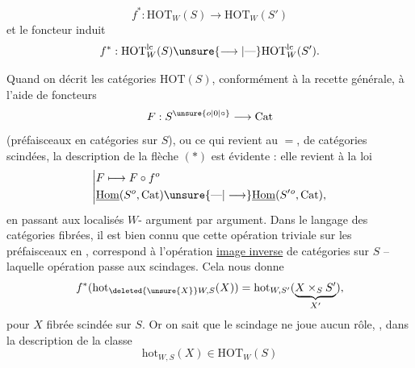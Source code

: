 \[
f^*:\mathrm{HOT}_W(S)\longrightarrow\mathrm{HOT}_W(S')\tag*{$(*)$}
\]
et le foncteur induit
\[
f^*:\mathrm{HOT}^{\mathrm{lc}}_W(S)\unsure{\longrightarrow|\text{---}}\mathrm{HOT}^{\mathrm{lc}}_W(S').
\]

Quand on décrit les catégories $\mathrm{HOT}(S)$, conformément à la recette générale, à l'aide de  foncteurs
\[
F:S^{\unsure{o|0|\circ}}\longrightarrow\mathrm{Cat}
\]
(préfaisceaux en catégories sur $S$), ou ce qui revient au $=$, de catégories scindées, la description de la  flèche $(*)$ est évidente : elle revient à la loi
\[
\left|\begin{aligned}
&F\longmapsto F\circ f^o\\
&\underline{\mathrm{Hom}}(S^o,\mathrm{Cat})\unsure{\text{---}|\longrightarrow}\underline{\mathrm{Hom}}(S'{}^o,\mathrm{Cat}),
\end{aligned}\right.
\]
en passant aux localisés  $W$- argument par argument. Dans le langage des catégories fibrées, il est bien connu que cette opération triviale sur les préfaisceaux en , correspond à l'opération \uline{image inverse} de catégories sur $S$ -- laquelle opération passe aux scindages.
Cela nous donne 
\[
f^*(\mathrm{hot}_{\deleted{\unsure{X}}W,S}(X))=\mathrm{hot}_{W,S'}(\underbrace{X\times_S S'}_{X'}),
\]
pour  $X$ fibrée scindée sur $S$. Or on sait que le scindage  ne joue aucun rôle, , dans la description de la classe
\[
\mathrm{hot}_{W,S}(X)\in\mathrm{HOT}_W(S)
\]
